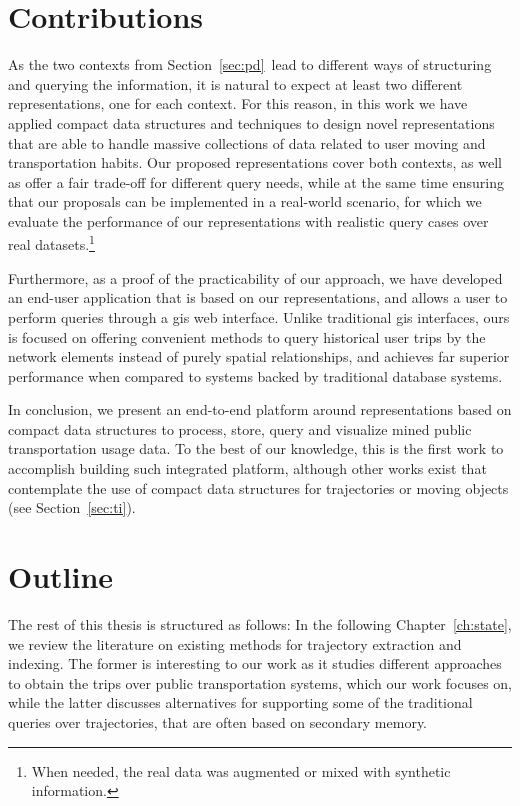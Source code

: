 \documentclass[a4paper,10pt,twoside]{book}
\begin{document}
	\section{Contributions}
	As the two contexts from Section~\ref{sec:pd}~lead to different ways of structuring and querying the information, it is natural to expect at least two different representations, one for each context. For this reason, in this work we have applied compact data structures and techniques to design novel representations that are able to handle massive collections of data related to user moving and transportation habits. Our proposed representations cover both contexts, as well as offer a fair trade-off for different query needs, while at the same time ensuring that our proposals can be implemented in a real-world scenario, for which we evaluate the performance of our representations with realistic query cases over real datasets.\footnote{When needed, the real data was augmented or mixed with synthetic information.}
	
	Furthermore, as a proof of the practicability of our approach, we have developed an end-user application that is based on our representations, and allows a user to perform queries through a \gls{gis} web interface. Unlike traditional \gls{gis} interfaces, ours is focused on offering convenient methods to query historical user trips by the network elements instead of purely spatial relationships, and achieves far superior performance when compared to systems backed by traditional database systems.
	
	In conclusion, we present an end-to-end platform around representations based on compact data structures to process, store, query and visualize mined public transportation usage data. To the best of our knowledge, this is the first work to accomplish building such integrated platform, although other works exist that contemplate the use of compact data structures for trajectories or moving objects (see Section~\ref{sec:ti}).
	
	\section{Outline}
	The rest of this thesis is structured as follows: In the following Chapter~\ref{ch:state}, we review the literature on existing methods for trajectory extraction and indexing. The former is interesting to our work as it studies different approaches to obtain the trips over public transportation systems, which our work focuses on, while the latter discusses alternatives for supporting some of the traditional queries over trajectories, that are often based on secondary memory.
	
\end{document}
